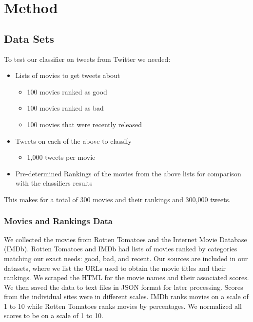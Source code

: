 \documentclass[12pt]{article}
\begin{document}
\section{Method}\label{S:2}
\subsection{Data Sets}\label{S:3}
To test our classifier on tweets from Twitter we needed: 
\begin{itemize}
  \item Lists of movies to get tweets about
  	\begin{itemize}
  		\item 100 movies ranked as good
  		\item 100 movies ranked as bad
  		\item 100 movies that were recently released
  	\end{itemize}
  \item Tweets on each of the above  to classify
  	\begin{itemize}
  		\item 1,000 tweets per movie
  	\end{itemize}
  \item Pre-determined Rankings of the movies from the above lists for comparison with the classifiers results
\end{itemize}
This makes for a total of 300 movies and their rankings and 300,000 tweets.
\subsubsection{Movies and Rankings Data}\label{S:4}
We collected the movies from Rotten Tomatoes and the Internet Movie Database (IMDb). Rotten Tomatoes and IMDb had lists of movies ranked by categories matching our exact needs: good, bad, and recent. Our sources are included in our datasets, where we list the URLs used to obtain the movie titles and their rankings.
We scraped the HTML for the movie names and their associated scores. We then saved the data to text files in JSON format for later processing. Scores from the individual sites were in different scales. IMDb ranks movies on a scale of 1 to 10 while Rotten Tomatoes ranks movies by percentages. We normalized all scores to be on a scale of 1 to 10.
\end{document}
